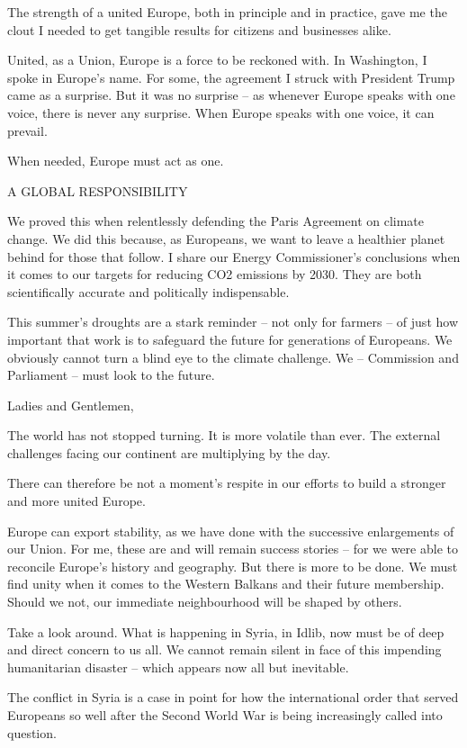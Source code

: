 \documentclass[a4paper,11pt]{article}
\begin{document}
The strength of a united Europe, both in principle and in practice, gave me the clout I needed to get tangible results for citizens and businesses alike.

United, as a Union, Europe is a force to be reckoned with. In Washington, I spoke in Europe's name. For some, the agreement I struck with President Trump came as a surprise. But it was no surprise – as whenever Europe speaks with one voice, there is never any surprise. When Europe speaks with one voice, it can prevail.

When needed, Europe must act as one.

 

A GLOBAL RESPONSIBILITY

We proved this when relentlessly defending the Paris Agreement on climate change. We did this because, as Europeans, we want to leave a healthier planet behind for those that follow. I share our Energy Commissioner's conclusions when it comes to our targets for reducing CO2 emissions by 2030. They are both scientifically accurate and politically indispensable.

This summer's droughts are a stark reminder – not only for farmers – of just how important that work is to safeguard the future for generations of Europeans. We obviously cannot turn a blind eye to the climate challenge. We – Commission and Parliament – must look to the future.

 

Ladies and Gentlemen,

The world has not stopped turning. It is more volatile than ever. The external challenges facing our continent are multiplying by the day.

There can therefore be not a moment's respite in our efforts to build a stronger and more united Europe.

Europe can export stability, as we have done with the successive enlargements of our Union. For me, these are and will remain success stories – for we were able to reconcile Europe's history and geography. But there is more to be done. We must find unity when it comes to the Western Balkans and their future membership. Should we not, our immediate neighbourhood will be shaped by others.

Take a look around. What is happening in Syria, in Idlib, now must be of deep and direct concern to us all. We cannot remain silent in face of this impending humanitarian disaster – which appears now all but inevitable.

The conflict in Syria is a case in point for how the international order that served Europeans so well after the Second World War is being increasingly called into question.
\end{document}
